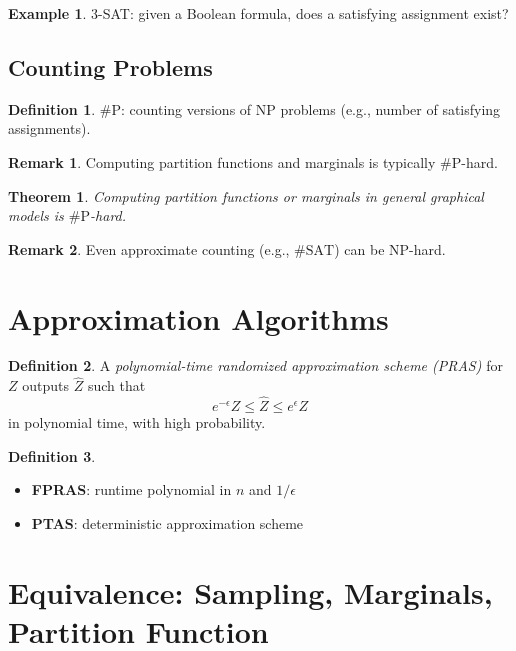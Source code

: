\documentclass[12pt,oneside]{book}
\numberwithin{equation}{section}
\theoremstyle{definition}
\newtheorem{definition}{Definition}[section]
\newtheorem{example}{Example}[section]
\newtheorem{remark}{Remark}[section]
\theoremstyle{plain}
\newtheorem{theorem}{Theorem}[section]
\theoremstyle{remark}
\begin{document}
\begin{example}
3-SAT: given a Boolean formula, does a satisfying assignment exist?
\end{example}


\subsection*{Counting Problems}

\begin{definition}
$\#\text{P}$: counting versions of NP problems (e.g., number of satisfying assignments).
\end{definition}

\begin{remark}
Computing partition functions and marginals is typically $\#\text{P}$-hard.
\end{remark}


\begin{theorem}
Computing partition functions or marginals in general graphical models is $\#\text{P}$-hard.
\end{theorem}

\begin{remark}
Even approximate counting (e.g., $\#\text{SAT}$) can be NP-hard.
\end{remark}


\section{Approximation Algorithms}

\begin{definition}
A \emph{polynomial-time randomized approximation scheme (PRAS)} for $Z$ outputs $\widehat{Z}$ such that
\[
e^{-\epsilon} Z \le \widehat{Z} \le e^{\epsilon} Z
\]
in polynomial time, with high probability.
\end{definition}

\begin{definition}
\begin{itemize}
\item \textbf{FPRAS}: runtime polynomial in $n$ and $1/\epsilon$
\item \textbf{PTAS}: deterministic approximation scheme
\end{itemize}
\end{definition}


\section*{Equivalence: Sampling, Marginals, Partition Function}
\end{document}
